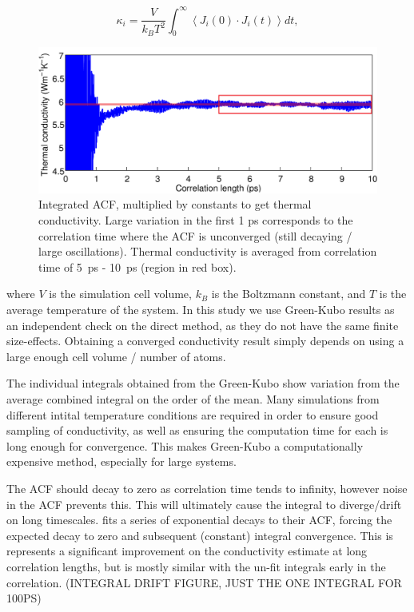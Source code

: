 \documentclass[%
preprint,                                  %
nofootinbib,
 amsmath,amssymb,
 aps,
]{revtex4-1}
\begin{document}
\begin{equation}
\kappa_i = \frac{V}{k_{B}T^2} \int_{0}^{\infty} \left \langle J_i(0) \cdot  J_i(t) \right \rangle dt ,
\label{gk-int}
\end{equation}
\begin{figure}[h]
  \includegraphics[width=\linewidth]{images/gk_int.png}
  \caption{Integrated ACF, multiplied by constants to get thermal conductivity. Large variation in the first 1 ps corresponds to the correlation time where the ACF is unconverged (still decaying / large oscillations). Thermal conductivity is averaged from correlation time of 5~ps - 10~ps (region in red box).}
  \label{fig:gk_int}
\end{figure}
where $V$ is the simulation cell volume, $k_B$ is the Boltzmann constant, and $T$ is the average temperature of the system. In this study we use Green-Kubo results as an independent check on the direct method, as they do not have the same finite size-effects. Obtaining a converged conductivity result simply depends on using a large enough cell volume / number of atoms. 

The individual integrals obtained from the Green-Kubo show variation from the average combined integral on the order of the mean. Many simulations from different intital temperature conditions are required in order to ensure good sampling of conductivity, as well as ensuring the computation time for each is long enough for convergence. This makes Green-Kubo a computationally expensive method, especially for large systems.

The ACF should decay to zero as correlation time tends to infinity, however noise in the ACF prevents this. This will ultimately cause the integral to diverge/drift on long timescales. \citet{Howell2012} fits a series of exponential decays to their ACF, forcing the expected decay to zero and subsequent (constant) integral convergence. This is represents a significant improvement on the conductivity estimate at long correlation lengths, but is mostly similar with the un-fit integrals early in the correlation. (INTEGRAL DRIFT FIGURE, JUST THE ONE INTEGRAL FOR 100PS)
\end{document}
